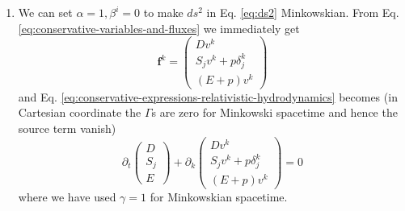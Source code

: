 \documentclass[10pt]{article}
\begin{document}
\begin{enumerate}
\item We can set $\alpha = 1, \beta^i = 0$ to make $ds^2$ in Eq. \eqref{eq:ds2} Minkowskian. From Eq. \eqref{eq:conservative-variables-and-fluxes} we immediately get
  \begin{equation}
    \label{eq:flux_minkowskian}
    \mathbf{f}^k =
    \begin{pmatrix}
      D v^k\\
      S_jv^k + p \delta^k_j\\
      (E + p)v^k
    \end{pmatrix}
  \end{equation}
  and Eq. \eqref{eq:conservative-expressions-relativistic-hydrodynamics} becomes (in Cartesian coordinate the $\Gamma$s are zero for Minkowski spacetime and hence the source term vanish)
  \begin{equation}
    \label{eq:conservative-expressions-minkowskian}
    \partial_t
    \boxed{\begin{pmatrix}
      D\\
      S_j\\
      E
    \end{pmatrix} + \partial_k
    \begin{pmatrix}
      D v^k\\
      S_jv^k + p \delta^k_j\\
      (E + p)v^k
    \end{pmatrix} = 0}
  \end{equation}
  where we have used $\gamma = 1$ for Minkowskian spacetime.


\end{enumerate}
\end{document}
